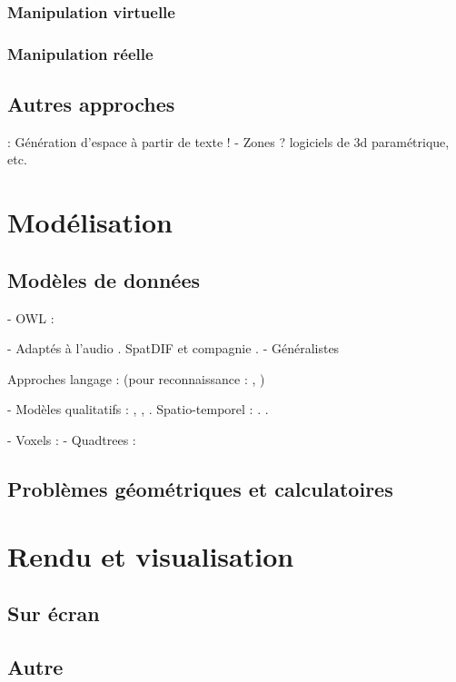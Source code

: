 \documentclass[french,12pt]{article}
\begin{document}
\cite{garcia_jeremie_processing_2015,garcia_towards_2015}
\cite{wakefield_cosm:_2011}
\cite{wagner_introducing_2014}
\cite{melchior_authoring_2005} 
\cite{bresson_spatial_2012}
\cite{wozniewski_spatosc:_2012}
\cite{favory_trajectoires:_2015}
\cite{casas_4d_2013}


\subsubsection{Manipulation virtuelle}
\cite{jacob_design_2014} %
\cite{cohen_interface_1999}
\subsubsection{Manipulation réelle}
\cite{grossman_interface_2003}


\subsection{Autres approches}
\cite{andriamarozakaniaina_du_2012} : Génération d'espace à partir de texte !
\cite{van_nort_lom_2006}
 - Zones ? logiciels de 3d paramétrique, etc.

\section{Modélisation}
\cite{porter_handbook_2008}
\cite{grenon_formal_2003}
\cite{zhang_timed_2014}
\cite{benford_spatial_1993}

\cite{matlage_every_2011}
\subsection{Modèles de données}
- OWL : \cite{mefteh_approche_2013}

- Adaptés à l'audio
. SpatDIF et compagnie \cite{peters_spatial_2013}\cite{kendall_towards_2008}
. \cite{kondoz_object-based_2014}
- Généralistes
\cite{hudak_arrows_2003}

Approches langage : (pour reconnaissance : \cite{spranger_recruitment_2011}\cite{spranger_emergent_2012}, )

- Modèles qualitatifs : \cite{chen_survey_2015}, \cite{bhatt_geospatial_2014}, \cite{schlieder_qualitative_1996,dorr_qualitative_2014}. Spatio-temporel : \cite{hazarika_qualitative_2012}. \cite{clementini_global_1997}.

- Voxels : \cite{kaufman_volume_1993}
- Quadtrees : \cite{eppstein_skip_2008}
\subsection{Problèmes géométriques et calculatoires}

\section{Rendu et visualisation}
\cite{hortner_spaxels_2012}
\subsection{Sur écran}
\subsection{Autre}
\printbibliography
\end{document}

